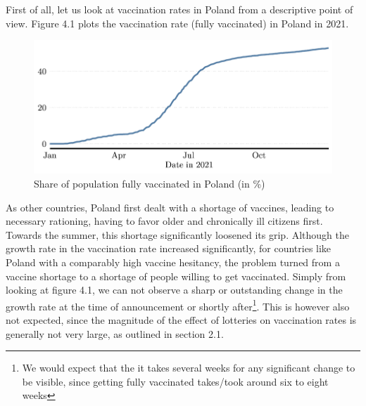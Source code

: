 \documentclass{scrbook}
\begin{document}
First of all, let us look at vaccination rates in Poland from a
descriptive point of view. Figure 4.1 plots the vaccination rate (fully
vaccinated) in Poland in 2021.

\begin{figure}[h]
\caption{Share of population fully vaccinated in Poland (in \%)}

\begin{center}\includegraphics{bachelor_thesis_files/figure-latex/unnamed-chunk-2-1} \end{center}
\end{figure}

\noindent As other countries, Poland first dealt with a shortage of
vaccines, leading to necessary rationing, having to favor older and
chronically ill citizens first. Towards the summer, this shortage
significantly loosened its grip. Although the growth rate in the
vaccination rate increased significantly, for countries like Poland with
a comparably high vaccine hesitancy, the problem turned from a vaccine
shortage to a shortage of people willing to get vaccinated. Simply from
looking at figure 4.1, we can not observe a sharp or outstanding change
in the growth rate at the time of announcement or shortly
after\footnote{We would expect that the it takes several weeks for any significant change to be visible, since getting fully vaccinated takes/took around six to eight weeks}.
This is however also not expected, since the magnitude of the effect of
lotteries on vaccination rates is generally not very large, as outlined
in section 2.1.
\end{document}

